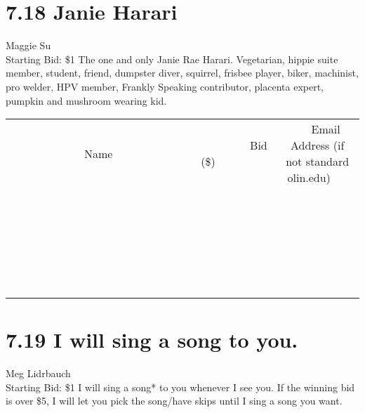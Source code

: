 \documentclass[11pt]{article}
\begin{document}
\section*{7.18 Janie Harari}
Maggie Su
\\
Starting Bid: \$1
\newline
The one and only Janie Rae Harari. Vegetarian, hippie suite member, student, friend, dumpster diver, squirrel, frisbee player, biker, machinist, pro welder, HPV member, Frankly Speaking contributor, placenta expert, pumpkin and mushroom wearing kid.
\\[6ex]
\begin{tabular}{c c c}
~~~~~~~~~~~~~Name~~~~~~~~~~~~~ & ~~~~~~~~~Bid (\$)~~~~~~~~~  & ~~~Email Address (if not standard olin.edu)~~~\\
 & & \\
\hline
 & & \\
\hline
 & & \\
\hline
 & & \\
\hline
 & & \\
\hline
 & & \\
\hline
 & & \\
\hline
 & & \\
\hline
 & & \\
\hline
 & & \\
\hline
 & & \\
\hline
 & & \\
\hline
 & & \\
\hline
 & & \\
\hline
 & & \\
\hline
 & & \\
\hline
 & & \\
\hline
 & & \\
\hline
 & & \\
\hline
 & & \\
\hline
 & & \\
\hline
 & & \\
\hline
 & & \\
\hline
 & & \\
\hline
 & & \\
\hline
 & & \\
\hline
\end{tabular}
\newpage
\section*{7.19 I will sing a song to you.}
Meg Lidrbauch
\\
Starting Bid: \$1
\newline
I will sing a song* to you whenever I see you. If the winning bid is over \$5, I will let you pick the song/have skips until I sing a song you want. 
\end{document}
